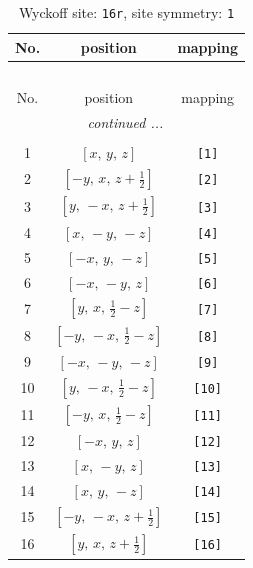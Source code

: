 \documentclass[fleqn,8pt]{jsarticle}
\begin{document}
\begin{longtable}{ccc}
\caption{Wyckoff site: {\tt 16r}, site symmetry: {\tt 1}}
 \\
 \hline \hline
No. & position & mapping \\ \hline \endfirsthead

\multicolumn{2}{l}{\tablename\ \thetable{}} \\
 \hline \hline
No. & position & mapping \\ \hline \endhead

 \hline \hline
\multicolumn{2}{r}{\footnotesize\it continued ...} \\ \endfoot

 \hline \hline
\multicolumn{2}{r}{} \\ \endlastfoot

1 & $\left[ x,\, y,\, z \right]$ & {\tt [1]} \\ \hline
2 & $\left[ - y,\, x,\, z + \frac{1}{2} \right]$ & {\tt [2]} \\ \hline
3 & $\left[ y,\, - x,\, z + \frac{1}{2} \right]$ & {\tt [3]} \\ \hline
4 & $\left[ x,\, - y,\, - z \right]$ & {\tt [4]} \\ \hline
5 & $\left[ - x,\, y,\, - z \right]$ & {\tt [5]} \\ \hline
6 & $\left[ - x,\, - y,\, z \right]$ & {\tt [6]} \\ \hline
7 & $\left[ y,\, x,\, \frac{1}{2} - z \right]$ & {\tt [7]} \\ \hline
8 & $\left[ - y,\, - x,\, \frac{1}{2} - z \right]$ & {\tt [8]} \\ \hline
9 & $\left[ - x,\, - y,\, - z \right]$ & {\tt [9]} \\ \hline
10 & $\left[ y,\, - x,\, \frac{1}{2} - z \right]$ & {\tt [10]} \\ \hline
11 & $\left[ - y,\, x,\, \frac{1}{2} - z \right]$ & {\tt [11]} \\ \hline
12 & $\left[ - x,\, y,\, z \right]$ & {\tt [12]} \\ \hline
13 & $\left[ x,\, - y,\, z \right]$ & {\tt [13]} \\ \hline
14 & $\left[ x,\, y,\, - z \right]$ & {\tt [14]} \\ \hline
15 & $\left[ - y,\, - x,\, z + \frac{1}{2} \right]$ & {\tt [15]} \\ \hline
16 & $\left[ y,\, x,\, z + \frac{1}{2} \right]$ & {\tt [16]} \\
\end{longtable}
\end{document}
